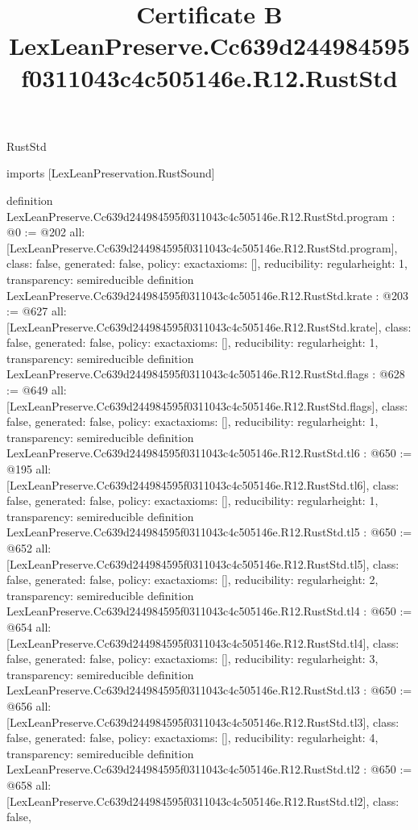 \begin{lexlean}{RustStd}
\title{Certificate B LexLeanPreserve.Cc639d244984595f0311043c4c505146e.R12.RustStd}
\begin{coremodule}
imports [LexLeanPreservation.RustSound]

definition LexLeanPreserve.Cc639d244984595f0311043c4c505146e.R12.RustStd.program : @0 := @202 {
  all: [LexLeanPreserve.Cc639d244984595f0311043c4c505146e.R12.RustStd.program],
  class: false,
  generated: false,
  policy: exact{axioms: []},
  reducibility: regular{height: 1},
  transparency: semireducible
}
definition LexLeanPreserve.Cc639d244984595f0311043c4c505146e.R12.RustStd.krate : @203 := @627 {
  all: [LexLeanPreserve.Cc639d244984595f0311043c4c505146e.R12.RustStd.krate],
  class: false,
  generated: false,
  policy: exact{axioms: []},
  reducibility: regular{height: 1},
  transparency: semireducible
}
definition LexLeanPreserve.Cc639d244984595f0311043c4c505146e.R12.RustStd.flags : @628 := @649 {
  all: [LexLeanPreserve.Cc639d244984595f0311043c4c505146e.R12.RustStd.flags],
  class: false,
  generated: false,
  policy: exact{axioms: []},
  reducibility: regular{height: 1},
  transparency: semireducible
}
definition LexLeanPreserve.Cc639d244984595f0311043c4c505146e.R12.RustStd.tl6 : @650 := @195 {
  all: [LexLeanPreserve.Cc639d244984595f0311043c4c505146e.R12.RustStd.tl6],
  class: false,
  generated: false,
  policy: exact{axioms: []},
  reducibility: regular{height: 1},
  transparency: semireducible
}
definition LexLeanPreserve.Cc639d244984595f0311043c4c505146e.R12.RustStd.tl5 : @650 := @652 {
  all: [LexLeanPreserve.Cc639d244984595f0311043c4c505146e.R12.RustStd.tl5],
  class: false,
  generated: false,
  policy: exact{axioms: []},
  reducibility: regular{height: 2},
  transparency: semireducible
}
definition LexLeanPreserve.Cc639d244984595f0311043c4c505146e.R12.RustStd.tl4 : @650 := @654 {
  all: [LexLeanPreserve.Cc639d244984595f0311043c4c505146e.R12.RustStd.tl4],
  class: false,
  generated: false,
  policy: exact{axioms: []},
  reducibility: regular{height: 3},
  transparency: semireducible
}
definition LexLeanPreserve.Cc639d244984595f0311043c4c505146e.R12.RustStd.tl3 : @650 := @656 {
  all: [LexLeanPreserve.Cc639d244984595f0311043c4c505146e.R12.RustStd.tl3],
  class: false,
  generated: false,
  policy: exact{axioms: []},
  reducibility: regular{height: 4},
  transparency: semireducible
}
definition LexLeanPreserve.Cc639d244984595f0311043c4c505146e.R12.RustStd.tl2 : @650 := @658 {
  all: [LexLeanPreserve.Cc639d244984595f0311043c4c505146e.R12.RustStd.tl2],
  class: false,
}
\end{coremodule}
\end{lexlean}

